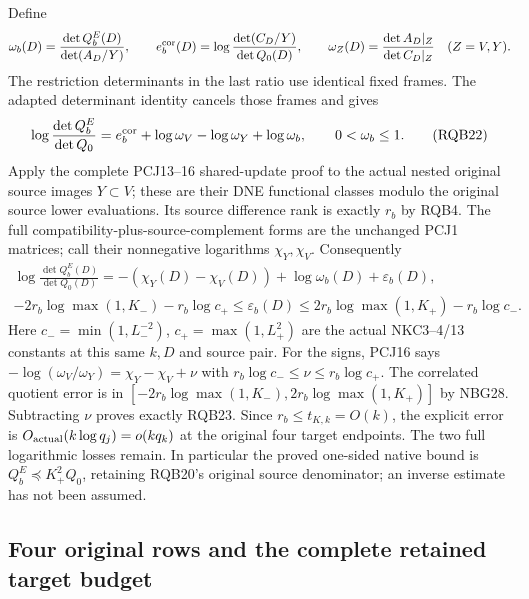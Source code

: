 \documentclass[10pt]{article}
\begin{document}
Define
\[
 \omega_b(D)=\frac{\det Q_b^E(D)}{\det(A_D/Y)},\qquad
 e_b^{\rm cor}(D)=\log\frac{\det(C_D/Y)}{\det Q_0(D)},\qquad
 \omega_Z(D)=\frac{\det A_D|_Z}{\det C_D|_Z}\quad(Z=V,Y).
\]
The restriction determinants in the last ratio use identical fixed
frames. The adapted determinant identity cancels those frames and gives
\[
 \log\frac{\det Q_b^E}{\det Q_0}
 =e_b^{\rm cor}+\log\omega_V-\log\omega_Y+\log\omega_b ,
 \qquad 0<\omega_b\le1 .
 \tag{RQB22}
\]
Apply the complete PCJ13--16 shared-update proof to the actual
nested original source images $Y\subset V$; these are their
DNE functional classes modulo the original source lower evaluations.
Its source difference rank is exactly $r_b$ by RQB4.
The full compatibility-plus-source-complement forms are the unchanged
PCJ1 matrices; call their nonnegative logarithms $\chi_Y,\chi_V$.
Consequently
\[
\begin{gathered}
 \log\frac{\det Q_b^E(D)}{\det Q_0(D)}
       =-(\chi_Y(D)-\chi_V(D))+\log\omega_b(D)+\varepsilon_b(D),\\
 -2r_b\log\max(1,K_-)-r_b\log c_+
       \le\varepsilon_b(D)
       \le2r_b\log\max(1,K_+)-r_b\log c_- .
\end{gathered}\tag{RQB23}
\]
Here $c_-=\min(1,L_-^{-2})$, $c_+=\max(1,L_+^2)$ are the
actual NKC3--4/13 constants at this same $k,D$ and source pair.
For the signs, PCJ16 says
$-\log(\omega_V/\omega_Y)=\chi_Y-\chi_V+\nu$ with
$r_b\log c_-\le\nu\le r_b\log c_+$.
The correlated quotient error is in
$[-2r_b\log\max(1,K_-),2r_b\log\max(1,K_+)]$ by NBG28.
Subtracting $\nu$ proves exactly RQB23.
Since $r_b\le t_{K,k}=O(k)$, the explicit error is
$O_{\rm actual}(k\log q_j)=o(kq_k)$ at the original four
target endpoints. The two full logarithmic losses remain.
In particular the proved one-sided native bound is
$Q_b^E\preceq K_+^2Q_0$, retaining RQB20's original source
denominator; an inverse estimate has not been assumed.

\subsection{Four original rows and the complete retained target budget}
\end{document}
